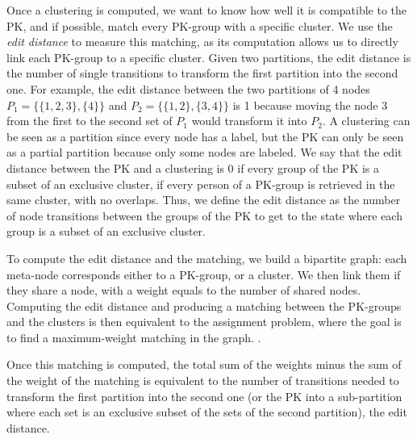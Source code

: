 Once a clustering is computed, we want to know how well it is compatible to the PK, and if possible, match every PK-group with a specific cluster.
We use the \textit{edit distance} to measure this matching, as its computation allows us to directly link each PK-group to a specific cluster.
Given two partitions, the edit distance is the number of single transitions to transform the first partition into the second one.
For example, the edit distance between the two partitions of 4 nodes $ P_1 = \{\{1,2,3\}, \{4\}\}$ and  $ P_2 = \{\{1,2\}, \{3,4\}\}$ is 1 because moving the node 3 from the first to the second set of $P_1$ would transform it into $P_2$.
A clustering can be seen as a partition since every node has a label, but the PK can only be seen as a partial partition because only some nodes are labeled.
We say that the edit distance between the PK and a clustering is 0 if every group of the PK is a subset of an exclusive cluster, \ie if every person of a PK-group is retrieved in the same cluster, with no overlaps.
Thus, we define the edit distance as the number of node transitions between the groups of the PK to get to the state where each group is a subset of an exclusive cluster. %


To compute the edit distance and the matching, we build a bipartite graph: each meta-node corresponds either to a PK-group, or a cluster. We then link them if they share a node, with a weight equals to the number of shared nodes.
Computing the edit distance and producing a matching between the PK-groups and the clusters is then equivalent to the assignment problem, where the goal is to find a maximum-weight matching in the graph. \cite{Assignment}.

Once this matching is computed, the total sum of the weights minus the sum of the weight of the matching is equivalent to the number of transitions needed to transform the first partition into the second one (or the PK into a sub-partition where each set is an exclusive subset of the sets of the second partition), \ie the edit distance.


